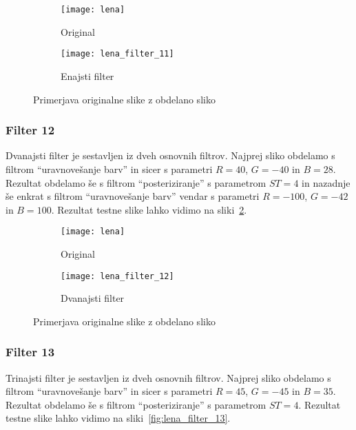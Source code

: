 \begin{figure}[!ht]
    \centering
    \begin{subfigure}[b]{0.4\textwidth}
        \texttt{[image: lena]}
        \caption{Original}
    \end{subfigure}
    \begin{subfigure}[b]{0.4\textwidth}
        \texttt{[image: lena\_filter\_11]}
        \caption{Enajsti filter}
    \end{subfigure}
    \caption{Primerjava originalne slike z obdelano sliko}
    \label{fig:lena_filter_11}
\end{figure}


\subsubsection*{Filter 12}
Dvanajsti filter je sestavljen iz dveh osnovnih filtrov. Najprej sliko obdelamo s
filtrom ``uravnovešanje barv'' in sicer s parametri $R = 40$, $G = -40$ in
$B = 28$. Rezultat obdelamo še s filtrom ``posteriziranje'' s parametrom
$ST= 4$ in nazadnje še enkrat s filtrom ``uravnovešanje barv'' vendar s
parametri $R = -100$, $G = -42$ in $B = 100$. Rezultat testne slike lahko
vidimo na sliki~\ref{fig:lena_filter_12}.

\begin{figure}[!ht]
    \centering
    \begin{subfigure}[b]{0.4\textwidth}
        \texttt{[image: lena]}
        \caption{Original}
    \end{subfigure}
    \begin{subfigure}[b]{0.4\textwidth}
        \texttt{[image: lena\_filter\_12]}
        \caption{Dvanajsti filter}
    \end{subfigure}
    \caption{Primerjava originalne slike z obdelano sliko}
    \label{fig:lena_filter_12}
\end{figure}


\subsubsection*{Filter 13}
Trinajsti filter je sestavljen iz dveh osnovnih filtrov. Najprej sliko obdelamo s
filtrom ``uravnovešanje barv'' in sicer s parametri $R = 45$, $G = -45$ in
$B = 35$. Rezultat obdelamo še s filtrom ``posteriziranje'' s parametrom
$ST =4$. Rezultat testne slike lahko vidimo na sliki~\ref{fig:lena_filter_13}.

